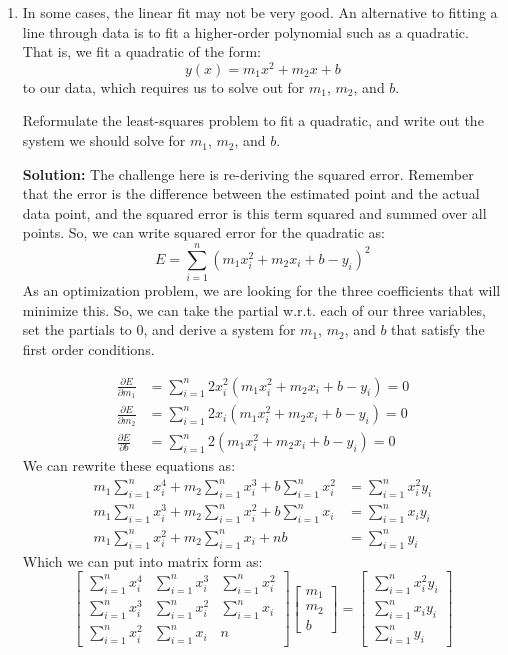 \documentclass[letterpaper, 11pt]{article}
\begin{document}
\begin{enumerate}
\item In some cases, the linear fit may not be very good. An alternative to fitting a line through data is to fit a higher-order polynomial such as a quadratic. That is, we fit a quadratic of the form:
\[ y(x) = m_1 x^2 + m_2 x + b\]
to our data, which requires us to solve out for $m_1$, $m_2$, and $b$. 
\par Reformulate the least-squares problem to fit a quadratic, and write out the system we should solve for $m_1$, $m_2$, and $b$.

\par \textbf{Solution:} The challenge here is re-deriving the squared error. Remember that the error is the difference between the estimated point and the actual data point, and the squared error is this term squared and summed over all points. So, we can write squared error for the quadratic as:
\[ E = \sum_{i=1}^n \left( m_1 x_i^2 + m_2 x_i + b - y_i\right)^2 \]
As an optimization problem, we are looking for the three coefficients that will minimize this. So, we can take the partial w.r.t. each of our three variables, set the partials to 0, and derive a system for $m_1$, $m_2$, and $b$ that satisfy the first order conditions. 

\begin{align*}
\frac{ \partial E}{\partial m_1} &= \sum_{i=1}^n 2x_i^2\left( m_1 x_i^2 + m_2 x_i + b - y_i\right) = 0\\
\frac{ \partial E}{\partial m_2 } &= \sum_{i=1}^n 2 x_i \left( m_1 x_i^2 + m_2 x_i + b - y_i\right) = 0\\
\frac{\partial E}{\partial b} &= \sum_{i=1}^n 2 \left( m_1 x_i^2 + m_2 x_i + b - y_i\right) = 0
\end{align*}
We can rewrite these equations as:
\begin{align*}
 m_1 \sum_{i=1}^nx_i^4 + m_2 \sum_{i=1}^n x_i^3 +  b \sum_{i=1}^n x_i^2 &= \sum_{i=1}^n x_i^2 y_i  \\
m_1 \sum_{i=1}^n x_i^3 + m_2 \sum_{i=1}^nx_i^2 + b \sum_{i=1}^n x_i  &= \sum_{i=1}^n x_iy_i \\
m_1 \sum_{i=1}^n x_i^2 + m_2 \sum_{i=1}^n x_i + nb  &= \sum_{i=1}^n y_i 
\end{align*}
Which we can put into matrix form as:
\[ \left[ \begin{array}{ccc} \sum_{i=1}^nx_i^4 &  \sum_{i=1}^n x_i^3 & \sum_{i=1}^n x_i^2 \\
\sum_{i=1}^n x_i^3 & \sum_{i=1}^nx_i^2  & \sum_{i=1}^n x_i  \\
\sum_{i=1}^n x_i^2 & \sum_{i=1}^n x_i & n \end{array} \right] 
\left[ \begin{array}{c} m_1 \\ m_2 \\ b \end{array} \right] = 
\left[ \begin{array}{c}  \sum_{i=1}^n x_i^2 y_i \\ \sum_{i=1}^n x_iy_i \\ \sum_{i=1}^n y_i  \end{array} \right]
\]


\end{enumerate}
\end{document}
